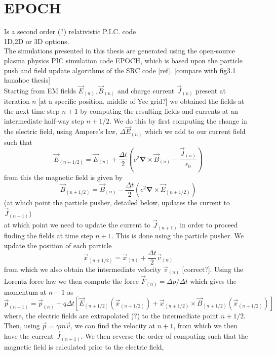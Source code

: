 \section{EPOCH}
Is a second order (?) relativistic P.I.C. code\\
1D,2D or 3D options.\\
The simulations presented in this thesis are generated using the open-source plasma physics PIC simulation code \textsc{EPOCH}, which is based upon the particle push and field update
algorithms of the SRC code [ref]. [compare with fig3.1 hanahoe thesis]\\
Starting from EM fields $\vec{E}_{(n)},\vec{B}_{(n)}$ and charge current $\vec{J}_{(n)}$ present at iteration $n$ [at a specific position, middle of Yee grid?] we obtained the fields at the next time step $n+1$ by computing the resulting fields and currents at an intermediate half-way step $n+1/2$. We do this by first computing the change in the electric field, using Ampere's law, $\Delta \vec{E}_{(n)}$ which we add to our current field such that
\begin{equation}
\vec{E}_{(n+1/2)}=\vec{E}_{(n)}+\frac{\Delta t}{2}\left(c^2\mathbf{\nabla}\times \vec{B}_{(n)}-\frac{\vec{J}_{(n)}}{\epsilon_0}\right)
\end{equation}
from this the magnetic field is given by
\begin{equation}
\vec{B}_{(n+1/2)}=\vec{B}_{(n)}-\frac{\Delta t}{2}\left(c^2\mathbf{\nabla}\times \vec{E}_{(n+1/2)}\right)
\end{equation}
(at which point the particle pusher, detailed below, updates the current to $\vec{J}_{(n+1)}$)\\
at which point we need to update the current to $\vec{J}_{(n+1)}$ in order to proceed finding the fields at time step $n+1$. This is done using the particle pusher. We update the position of each particle 
\begin{equation}
\vec{x}_{(n+1/2)}=\vec{x}_{(n)}+\frac{\Delta t}{2}\vec{v}_{(n)}
\end{equation}
from which we also obtain the intermediate velocity $\vec{v}_{(n)}$ [correct?]. Using the Lorentz force law we then compute the force $\vec{F}_{(n)}=\Delta p/\Delta t$ which gives the momentum at $n+1$ as
\begin{equation}
\vec{p}_{(n+1)}=\vec{p}_{(n)}+q\Delta t\left[\vec{E}_{(n+1/2)}\left(\vec{x}_{(n+1/2)}\right)+\vec{x}_{(n+1/2)}\times\vec{B}_{(n+1/2)}\left(\vec{x}_{(n+1/2)}\right) \right]
\end{equation}
where, the electric fields are extrapolated (?) to the intermediate point $n+1/2$. Then, using $\vec{p}=\gamma m \vec{v}$, we can find the velocity at $n+1$, from which we then have the current $\vec{J}_{(n+1)}$. We then reverse the order of computing such that the magnetic field is calculated prior to the electric field,
